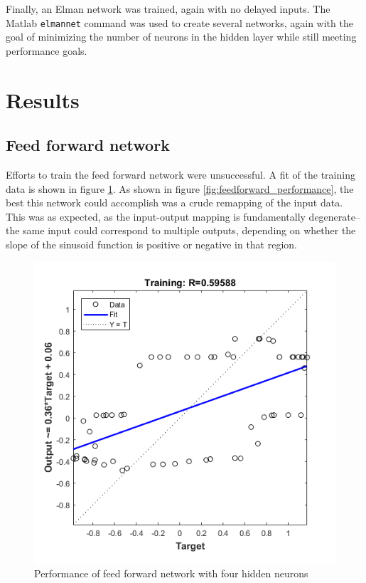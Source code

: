 \documentclass{IEEEtran}
\begin{document}
Finally, an Elman network was trained, again with no delayed inputs. The Matlab \verb|elmannet| command was used to create several networks, again with the goal of minimizing the number of neurons in the hidden layer while still meeting performance goals.

\section{Results\label{sn:results}}
\subsection{Feed forward network\label{sn:feedforward}}
Efforts to train the feed forward network were unsuccessful. A fit of the training data is shown in figure \ref{fig:ffnetperf}. As shown in figure \ref{fig:feedforward_performance}, the best this network could accomplish was a crude remapping of the input data. This was as expected, as the input-output mapping is fundamentally degenerate--the same input could correspond to multiple outputs, depending on whether the slope of the sinusoid function is positive or negative in that region.

\begin{figure}[ht]
    \centering
    \includegraphics[width=\linewidth]{feedforward/feedforward_regression}
    \caption{Performance of feed forward network with four hidden neurons \label{fig:ffnetperf}}
\end{figure}
\end{document}
